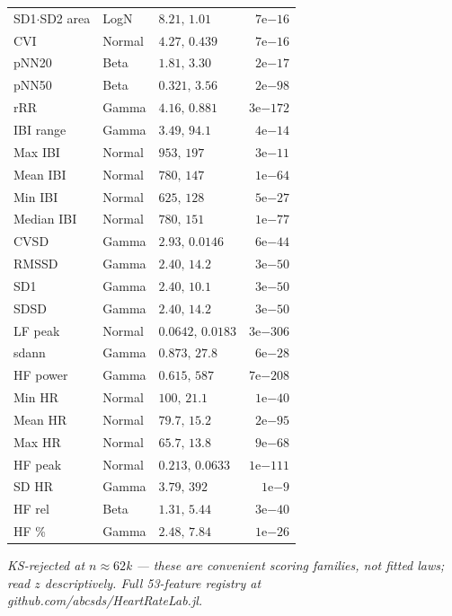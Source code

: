 \documentclass[fontsize=9pt]{scrartcl}
\newlength{\panelA}\setlength{\panelA}{97mm}
\begin{document}
\begin{minipage}[t][210mm][t]{\panelA}
\begin{tcolorbox}[panel,colback=jcindigodk,width=\panelA,height=210mm,fontupper=\color{white}]
\begin{tcolorbox}[card, borderline west={2.2mm}{0mm}{jcgreen}]
{\begin{tabular}{@{}l l l r@{}}
      SD1$\cdot$SD2 area & LogN & $8.21,\,1.01$ & $7\mathrm{e}{-16}$\\
      CVI & Normal & $4.27,\,0.439$ & $7\mathrm{e}{-16}$\\
      pNN20 & Beta & $1.81,\,3.30$ & $2\mathrm{e}{-17}$\\
      pNN50 & Beta & $0.321,\,3.56$ & $2\mathrm{e}{-98}$\\
      rRR & Gamma & $4.16,\,0.881$ & $3\mathrm{e}{-172}$\\
      IBI range & Gamma & $3.49,\,94.1$ & $4\mathrm{e}{-14}$\\
      Max IBI & Normal & $953,\,197$ & $3\mathrm{e}{-11}$\\
      Mean IBI & Normal & $780,\,147$ & $1\mathrm{e}{-64}$\\
      Min IBI & Normal & $625,\,128$ & $5\mathrm{e}{-27}$\\
      Median IBI & Normal & $780,\,151$ & $1\mathrm{e}{-77}$\\
      CVSD & Gamma & $2.93,\,0.0146$ & $6\mathrm{e}{-44}$\\
      RMSSD & Gamma & $2.40,\,14.2$ & $3\mathrm{e}{-50}$\\
      SD1 & Gamma & $2.40,\,10.1$ & $3\mathrm{e}{-50}$\\
      SDSD & Gamma & $2.40,\,14.2$ & $3\mathrm{e}{-50}$\\
      LF peak & Normal & $0.0642,\,0.0183$ & $3\mathrm{e}{-306}$\\
      sdann & Gamma & $0.873,\,27.8$ & $6\mathrm{e}{-28}$\\
      HF power & Gamma & $0.615,\,587$ & $7\mathrm{e}{-208}$\\
      Min HR & Normal & $100,\,21.1$ & $1\mathrm{e}{-40}$\\
      Mean HR & Normal & $79.7,\,15.2$ & $2\mathrm{e}{-95}$\\
      Max HR & Normal & $65.7,\,13.8$ & $9\mathrm{e}{-68}$\\
      HF peak & Normal & $0.213,\,0.0633$ & $1\mathrm{e}{-111}$\\
      SD HR & Gamma & $3.79,\,392$ & $1\mathrm{e}{-9}$\\
      HF rel & Beta & $1.31,\,5.44$ & $3\mathrm{e}{-40}$\\
      HF \% & Gamma & $2.48,\,7.84$ & $1\mathrm{e}{-26}$\\
    \end{tabular}\par}
    \vspace{1.6mm}
    {\footnotesize\color{jcpurple}\itshape KS-rejected at $n\approx62$k --- these
     are convenient scoring families, not fitted laws; read $z$ descriptively.
     Full 53-feature registry at github.com/abcsds/HeartRateLab.jl.\par}
  \end{tcolorbox}
\end{tcolorbox}%
\end{minipage}%
\end{document}
